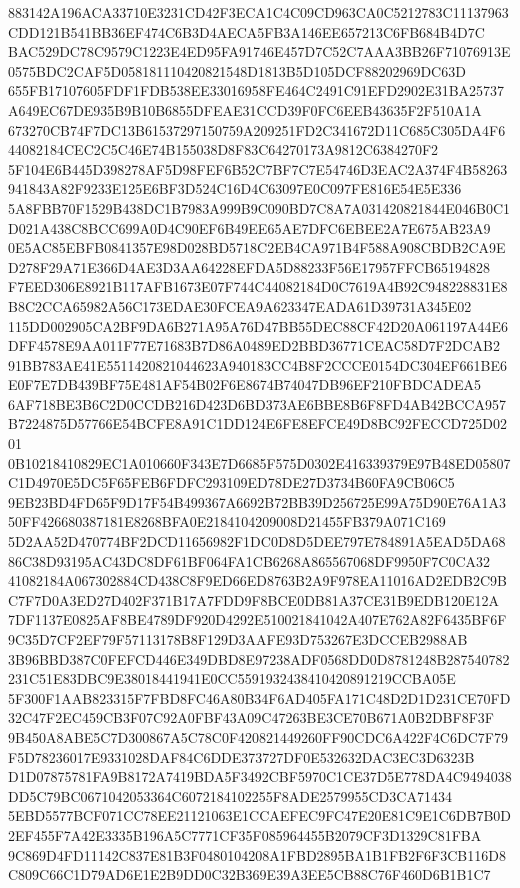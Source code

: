 \documentclass[UTF8,fontset=fandol,zihao=-4,a4paper]{ctexart}
\begin{document}
{{883142A196ACA33710E3231CD42F3ECA1C4C09CD963CA0C5212783C11137963CDD121B541BB36EF474C6B3D4AECA5FB3A146EE657213C6FB684B4D7C
BAC529DC78C9579C1223E4ED95FA91746E457D7C52C7AAA3BB26F71076913E0575BDC2CAF5D058181110420821548D1813B5D105DCF88202969DC63D
655FB17107605FDF1FDB538EE33016958FE464C2491C91EFD2902E31BA25737A649EC67DE935B9B10B6855DFEAE31CCD39F0FC6EEB43635F2F510A1A
673270CB74F7DC13B61537297150759A209251FD2C341672D11C685C305DA4F644082184CEC2C5C46E74B155038D8F83C64270173A9812C6384270F2
5F104E6B445D398278AF5D98FEF6B52C7BF7C7E54746D3EAC2A374F4B58263941843A82F9233E125E6BF3D524C16D4C63097E0C097FE816E54E5E336
5A8FBB70F1529B438DC1B7983A999B9C090BD7C8A7A031420821844E046B0C1D021A438C8BCC699A0D4C90EF6B49EE65AE7DFC6EBEE2A7E675AB23A9
0E5AC85EBFB0841357E98D028BD5718C2EB4CA971B4F588A908CBDB2CA9ED278F29A71E366D4AE3D3AA64228EFDA5D88233F56E17957FFCB65194828
F7EED306E8921B117AFB1673E07F744C44082184D0C7619A4B92C948228831E8B8C2CCA65982A56C173EDAE30FCEA9A623347EADA61D39731A345E02
115DD002905CA2BF9DA6B271A95A76D47BB55DEC88CF42D20A061197A44E6DFF4578E9AA011F77E71683B7D86A0489ED2BBD36771CEAC58D7F2DCAB2
91BB783AE41E5511420821044623A940183CC4B8F2CCCE0154DC304EF661BE6E0F7E7DB439BF75E481AF54B02F6E8674B74047DB96EF210FBDCADEA5
6AF718BE3B6C2D0CCDB216D423D6BD373AE6BBE8B6F8FD4AB42BCCA957B7224875D57766E54BCFE8A91C1DD124E6FE8EFCE49D8BC92FECCD725D0201
0B10218410829EC1A010660F343E7D6685F575D0302E416339379E97B48ED05807C1D4970E5DC5F65FEB6FDFC293109ED78DE27D3734B60FA9CB06C5
9EB23BD4FD65F9D17F54B499367A6692B72BB39D256725E99A75D90E76A1A350FF426680387181E8268BFA0E2184104209008D21455FB379A071C169
5D2AA52D470774BF2DCD11656982F1DC0D8D5DEE797E784891A5EAD5DA6886C38D93195AC43DC8DF61BF064FA1CB6268A865567068DF9950F7C0CA32
41082184A067302884CD438C8F9ED66ED8763B2A9F978EA11016AD2EDB2C9BC7F7D0A3ED27D402F371B17A7FDD9F8BCE0DB81A37CE31B9EDB120E12A
7DF1137E0825AF8BE4789DF920D4292E510021841042A407E762A82F6435BF6F9C35D7CF2EF79F57113178B8F129D3AAFE93D753267E3DCCEB2988AB
3B96BBD387C0FEFCD446E349DBD8E97238ADF0568DD0D8781248B287540782231C51E83DBC9E38018441941E0CC5591932438410420891219CCBA05E
5F300F1AAB823315F7FBD8FC46A80B34F6AD405FA171C48D2D1D231CE70FD32C47F2EC459CB3F07C92A0FBF43A09C47263BE3CE70B671A0B2DBF8F3F
9B450A8ABE5C7D300867A5C78C0F420821449260FF90CDC6A422F4C6DC7F79F5D78236017E9331028DAF84C6DDE373727DF0E532632DAC3EC3D6323B
D1D07875781FA9B8172A7419BDA5F3492CBF5970C1CE37D5E778DA4C9494038DD5C79BC0671042053364C6072184102255F8ADE2579955CD3CA71434
5EBD5577BCF071CC78EE21121063E1CCAEFEC9FC47E20E81C9E1C6DB7B0D2EF455F7A42E3335B196A5C7771CF35F085964455B2079CF3D1329C81FBA
9C869D4FD11142C837E81B3F0480104208A1FBD2895BA1B1FB2F6F3CB116D8C809C66C1D79AD6E1E2B9DD0C32B369E39A3EE5CB88C76F460D6B1B1C7
}}
\end{document}
